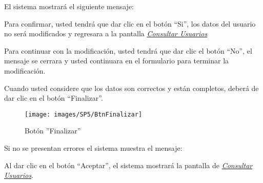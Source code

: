                 El sistema mostrará el siguiente mensaje:
                
                
                Para confirmar, usted tendrá que dar clic en el botón “Si”, los datos del usuario no será modificados  y regresara a la pantalla \hyperlink{consultarUs}{\textit{Consultar Usuarios}}
            
                Para continuar con la modificación, usted tendrá que  dar clic el botón “No”, el mensaje se cerrara y usted continuara en el formulario para terminar la modificación.
                
                Cuando usted considere que los datos son correctos y están completos, deberá de dar clic en el botón “Finalizar”.
                \begin{figure}[!hbtp]
                    \centering
                    \hypertarget{btnfin}{\texttt{[image: images/SP5/BtnFinalizar]}}
                    \caption{Botón ''Finalizar''}
                    \label{btnfin}
                \end{figure}
                
                Si no se presentan errores el sistema muestra el mensaje:
                	
                
                Al dar clic en el botón “Aceptar”, el sistema mostrará la pantalla de \hyperlink{consultarUs}{\textit{Consultar Usuarios}}.
                
